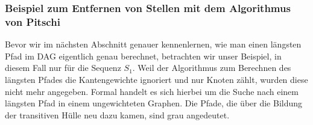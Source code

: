\subsubsection{Beispiel zum Entfernen von Stellen mit dem Algorithmus von Pitschi}

Bevor wir im nächsten Abschnitt genauer kennenlernen, wie man einen längsten Pfad im DAG eigentlich genau berechnet, betrachten wir unser Beispiel, in diesem Fall nur für die Sequenz $S_1$. Weil der Algorithmus zum Berechnen des längsten Pfades die Kantengewichte ignoriert und nur Knoten zählt, wurden diese nicht mehr angegeben. Formal handelt es sich hierbei um die Suche nach einem längsten Pfad in einem ungewichteten Graphen. Die Pfade, die über die Bildung der transitiven Hülle neu dazu kamen, sind grau angedeutet.

\begin{center}
	\begin{tikzpicture}[
	mycircle/.style={
		circle,
		draw=black,
		fill opacity = 0.3,
		text opacity=1,
		inner sep=0pt,
		minimum size=15pt,
		font=\tiny},
	myarrow/.style={-Stealth},
	node distance=0.6cm and 1.1cm
	]
	

\end{tikzpicture}
\end{center}
